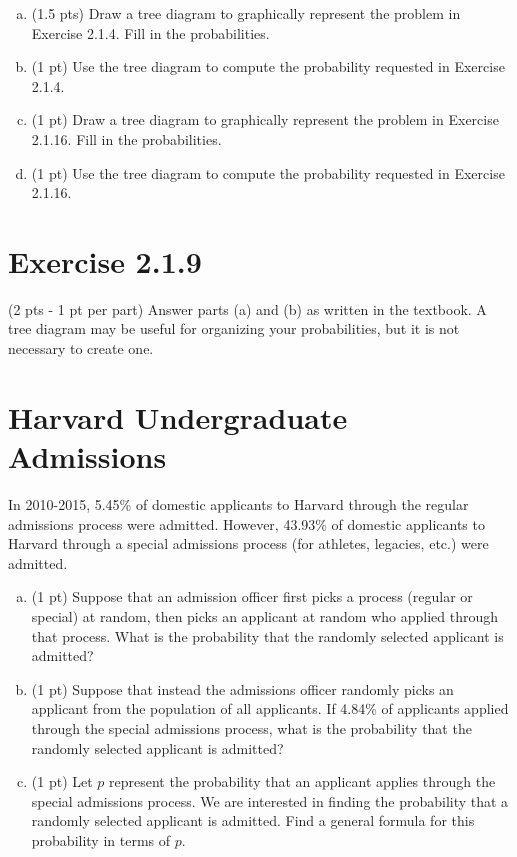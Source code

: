 \documentclass{article}
\begin{document}
\begin{enumerate}[(a)]
\item (1.5 pts) Draw a tree diagram to graphically represent the problem in Exercise 2.1.4. Fill in the probabilities.
\item (1 pt) Use the tree diagram to compute the probability requested in Exercise 2.1.4.
\item (1 pt) Draw a tree diagram to graphically represent the problem in Exercise 2.1.16. Fill in the probabilities.
\item (1 pt) Use the tree diagram to compute the probability requested in Exercise 2.1.16.
\end{enumerate}

\section{Exercise 2.1.9}
(2 pts - 1 pt per part) Answer parts (a) and (b) as written in the textbook. A tree diagram may be useful for organizing your probabilities, but it is not necessary to create one.

\section{Harvard Undergraduate Admissions}

In 2010-2015, 5.45\% of domestic applicants to Harvard through the regular admissions process were admitted. However, 43.93\% of domestic applicants to Harvard through a special admissions process (for athletes, legacies, etc.) were admitted.

\begin{enumerate}[(a)]
\item (1 pt) Suppose that an admission officer first picks a process (regular or special) at random, then picks an applicant at random who applied through that process. What is the probability that the randomly selected applicant is admitted?
\item (1 pt) Suppose that instead the admissions officer randomly picks an applicant from the population of all applicants. If 4.84\% of applicants applied through the special admissions process, what is the probability that the randomly selected applicant is admitted?
\item (1 pt) Let $p$ represent the probability that an applicant applies through the special admissions process. We are interested in finding the probability that a randomly selected applicant is admitted. Find a general formula for this probability in terms of $p$.
\end{enumerate} 
\end{document}
